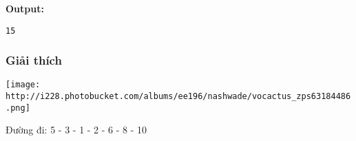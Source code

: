 \textbf{    Output:   }
\begin{verbatim}
15\end{verbatim}

\subsubsection{   Giải thích  }


\texttt{[image: http://i228.photobucket.com/albums/ee196/nashwade/vocactus\_zps63184486.png]}

   Đường đi: 5 - 3 - 1 - 2 - 6 - 8 - 10  